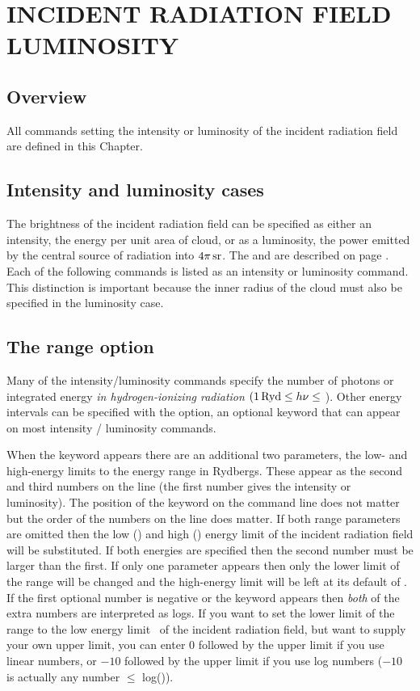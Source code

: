 \chapter{INCIDENT RADIATION FIELD LUMINOSITY}
\label{sec:IncidentRadiationFieldLuminosity}
\section{Overview}

All commands setting the intensity or luminosity of the
incident radiation field are
defined in this Chapter.

\section{Intensity and luminosity cases}
The brightness of the incident radiation field can be specified
as either an intensity, the energy per unit area of cloud,
or as a luminosity, the power emitted by the central
source of radiation into $4 \pi {\rm\thinspace sr}$.
The  and 
are described on page \pageref{sec:IntensityLuminosityCases}.
Each of the following commands is listed as an intensity or
luminosity command.
This distinction is important because the inner radius of the
cloud must also be specified in the luminosity case.

\section{The range option}

Many of the intensity/luminosity commands specify the number of photons
or integrated energy \emph{in hydrogen-ionizing radiation}
$(1 {\rm\thinspace Ryd} \le h\nu \le$ \egamry ).
Other
energy intervals can be specified with the  option, an optional keyword
that can appear on most intensity / luminosity commands.

When the keyword  appears there are an
additional two parameters,
the low- and high-energy limits to the energy range in Rydbergs.
These
appear as the second and third numbers on the line
(the first number gives
the intensity or luminosity).
The position of the keyword  on the
command line does not matter but the order of the numbers on the line does
matter.
If both range parameters are omitted then the low
(\emm ) and high (\egamry )
energy limit of the incident radiation field will be
substituted.  If both energies are specified then the
second number must be larger than the first.
If only
one parameter appears then only the lower limit of the range
will be changed
and the high-energy limit will be left at its default of
\egamry .
If the first optional number is negative or
the keyword  appears then
\emph{both} of the extra numbers are interpreted as logs.
If you want to set the lower limit of the range to the low
energy limit \emm\ of the incident radiation field, but want
to supply your own upper limit, you can enter 0 followed by
the upper limit if you use linear numbers, or $-10$ followed by
the upper limit if you use log numbers ($-10$ is actually any
number $\leq$ log(\emm)).

